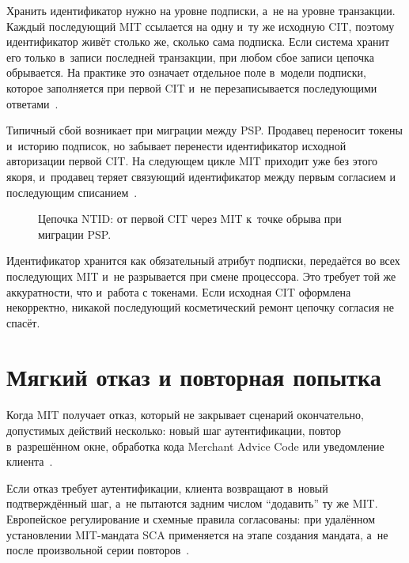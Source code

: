 Хранить идентификатор нужно на уровне подписки, а~не на уровне
транзакции. Каждый последующий MIT ссылается на одну и~ту же
исходную CIT, поэтому идентификатор живёт столько же, сколько
сама подписка. Если система хранит его только в~записи
последней транзакции, при любом сбое записи цепочка обрывается.
На практике это означает отдельное поле в~модели подписки,
которое заполняется при первой CIT и~не перезаписывается
последующими ответами~\cite{cybs-mc-subscription-mit}.

Типичный сбой возникает при миграции между PSP. Продавец переносит
токены и~историю подписок, но забывает перенести идентификатор
исходной авторизации первой CIT. На следующем цикле MIT приходит уже
без этого якоря, и~продавец теряет связующий идентификатор
между первым согласием и последующим списанием~\cite{mc-tpr,cybs-mc-subscription-mit}.

\begin{figure}[tbp]
  \centering
  \caption{Цепочка NTID: от первой CIT через MIT к~точке обрыва при миграции PSP.}\label{fig:ntid-chain}
\end{figure}

Идентификатор хранится как обязательный атрибут подписки,
передаётся во всех последующих MIT и~не разрывается при смене
процессора. Это требует той же аккуратности, что и~работа с
токенами. Если исходная CIT оформлена некорректно, никакой
последующий косметический ремонт цепочку согласия не спасёт.

\section{Мягкий отказ и повторная попытка}\label{sec:subscriptions-soft-decline}

Когда MIT получает отказ, который не закрывает сценарий окончательно,
допустимых действий несколько: новый шаг аутентификации, повтор
в~разрешённом окне, обработка кода Merchant Advice Code
или уведомление клиента~\cite{visa-core-rules,mc-tpr}.

Если отказ требует аутентификации, клиента возвращают в~новый
подтверждённый шаг, а~не пытаются задним числом \enquote{додавить} ту
же MIT. Европейское регулирование и схемные правила согласованы:
при удалённом установлении MIT-мандата SCA применяется на этапе
создания мандата, а~не после произвольной серии
повторов~\cite{eba-mit-qa,mc-tpr}.

